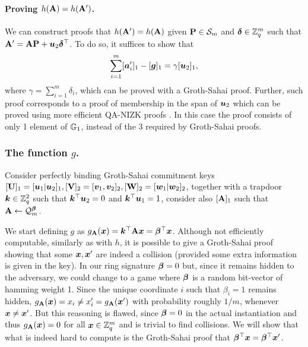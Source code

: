 \paragraph{Proving $h(\mathbf{{A}})=h(\mathbf{{A}}')$.} We can construct proofs that $h(\mathbf{{A}}') = h(\mathbf{{A}})$ given $\mathbf{{P}}\in\mathcal{S}_m$ and ${\boldsymbol{\delta}}\in\mathbb{Z}_q^m$ such that $\mathbf{{A}}' = \mathbf{{A}}\mathbf{{P}}+{\boldsymbol{u}}_2{\boldsymbol{\delta}}^\top$. To do so, it suffices to show that
\begin{equation}
\sum_{i=1}^{m}[{\boldsymbol{a}}'_i]_1 - [{\boldsymbol{g}}]_1 = \gamma[{\boldsymbol{u}}_2]_1,
\label{eq:coll-h}
\end{equation}
where $\gamma = \sum_{i=1}^m \delta_i$,
which can be proved with a Groth-Sahai proof. Further, such proof corresponds to a proof of membership in the span of ${\boldsymbol{u}}_2$ which can be proved using more efficient QA-NIZK proofs \cite{C:JutRoy14,EC:KilWee15}. In this case the proof consists of only 1 element of $\mathbb{G}_1$, instead of the $3$ required by Groth-Sahai proofs.

\subsubsection{The function $g$.} Consider perfectly binding Groth-Sahai commitment keys $[\mathbf{{U}}]_1=[{\boldsymbol{u}}_1|{\boldsymbol{u}}_2]_1,[\mathbf{{V}}]_2=[{\boldsymbol{v}}_1,{\boldsymbol{v}}_2]_2,[\mathbf{{W}}]_2 = [{\boldsymbol{w}}_1|{\boldsymbol{w}}_2]_2$, together with a trapdoor ${\boldsymbol{k}}\in\mathbb{Z}_q^2$ such that ${\boldsymbol{k}}^\top{\boldsymbol{u}}_2=0$ and ${\boldsymbol{k}}^\top{\boldsymbol{u}}_1=1$, consider also $[\mathbf{{A}}]_1$ such that $\mathbf{{A}}\gets\mathcal{Q}_m^{\boldsymbol{\beta}}$.

We start defining $g$ as $g_{\mathbf{{A}}}({\boldsymbol{x}}) = {\boldsymbol{k}}^\top\mathbf{{A}}{\boldsymbol{x}} = {\boldsymbol{\beta}}^\top{\boldsymbol{x}}$. Although not efficiently computable, similarly as with $h$, it is possible to give a Groth-Sahai proof showing that some ${\boldsymbol{x}},{\boldsymbol{x}}'$ are indeed a collision (provided some extra information is given in the key).
In our ring signature ${\boldsymbol{\beta}}=0$ but, since it remains hidden to the adversary, we could change to a game where ${\boldsymbol{\beta}}$ is a random bit-vector of hamming weight 1. Since the unique coordinate $i$ such that $\beta_i=1$ remains hidden, $g_{\mathbf{{A}}}({\boldsymbol{x}}) = x_i \neq x'_i =g_{\mathbf{{A}}}({\boldsymbol{x}}')$ with probability roughly $1/m$, whenever ${\boldsymbol{x}}\neq{\boldsymbol{x}}'$. But this reasoning is flawed, since ${\boldsymbol{\beta}}=0$ in the actual instantiation and thus $g_{\mathbf{{A}}}({\boldsymbol{x}}) = 0$ for all ${\boldsymbol{x}}\in\mathbb{Z}_q^m$ and is trivial to find collisions.
We will show that what is indeed hard to compute is the Groth-Sahai proof that ${\boldsymbol{\beta}}^\top{\boldsymbol{x}} = {\boldsymbol{\beta}}^\top{\boldsymbol{x}}'$.%

